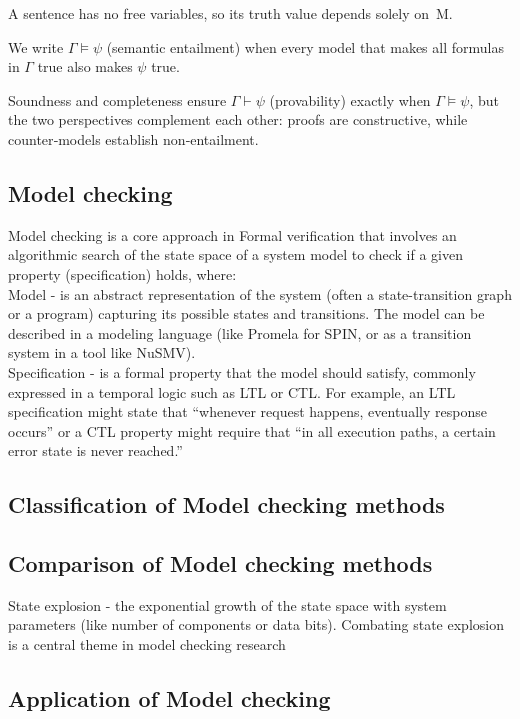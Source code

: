 A sentence has no free variables, so its truth value depends solely on M.  

We write $\Gamma\models\psi$ (semantic entailment) when every model that makes all formulas in $\Gamma$ true also makes $\psi $ true. 

Soundness and completeness ensure $\Gamma\vdash\psi$ (provability) exactly when $\Gamma\models\psi$,
but the two perspectives complement each other: proofs are constructive, while counter‑models establish non‑entailment.



\subsection {Model checking}

Model checking is a core approach in Formal verification that involves an algorithmic search of the state space of a system model to check if a
given property (specification) holds, where:\\
Model - is an abstract representation of the system (often a state-transition graph or a
program) capturing its possible states and transitions. The model can be described in a modeling language
(like Promela for SPIN, or as a transition system in a tool like NuSMV). \\
Specification - is a formal property that the model should satisfy, commonly expressed in a temporal logic such as LTL or CTL. For example, an LTL
specification might state that “whenever request happens, eventually response occurs” or a CTL property
might require that “in all execution paths, a certain error state is never reached.” \\ 
\subsection {Classification of Model checking methods}
\subsection {Comparison of Model checking methods}

State explosion - the exponential growth of the state space with system parameters (like number of components or data bits).
Combating state explosion is a central theme in model checking research


\subsection {Application of Model checking}
